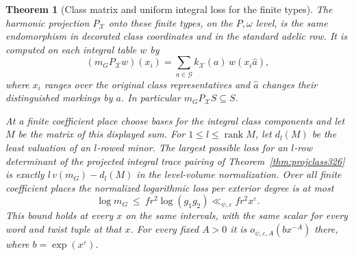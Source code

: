 \documentclass[a4paper,11pt]{article}
\newtheorem{theorem}[proposition]{Theorem}
\theoremstyle{definition}
\theoremstyle{remark}
\numberwithin{equation}{section}
\begin{document}
\begin{theorem}[Class matrix and uniform integral loss for the finite types]\leavevmode
\label{thm:terminaltypes327}
The harmonic projection \(P_{\mathcal X}\) onto these finite
types, on the \(P,\omega\) level, is the same endomorphism in
decorated class coordinates and in the standard adelic row.
It is computed on each integral table \(w\) by
\[
       (m_G P_{\mathcal X} w)(x_i)
           =\sum_{a\in\mathcal G}k_{\mathcal X}(a)\,w(x_i\widehat a),
\]
where \(x_i\) ranges over the original class representatives
and \(\widehat a\) changes their distinguished markings by \(a\).
In particular \(m_G P_{\mathcal X}S\subseteq S\).

At a finite coefficient place choose bases for the integral
class components and let \(M\) be the matrix of this displayed
sum. For \(1\le l\le\operatorname{rank}M\), let \(d_l(M)\)
be the least valuation of an \(l\)-rowed minor. The largest
possible loss for an \(l\)-row determinant of the projected
integral trace pairing of Theorem~\ref{thm:projclass326} is
exactly \(l\,v(m_G)-d_l(M)\) in the level-volume normalization.
Over all finite coefficient places the normalized logarithmic
loss per exterior degree is at most
\[
 \log m_G \ \le\ f r^2\log(g_1g_2)
       \ll_{\psi,\varepsilon} f r^2 x^\varepsilon.
\]
This bound holds at every \(x\) on the same intervals, with
the same scalar for every word and twist tuple at that \(x\).
For every fixed \(A>0\) it is \(o_{\psi,\varepsilon,A}(b x^{-A})\)
there, where \(b=\exp(x^\varepsilon)\).
\end{theorem}
\end{document}
